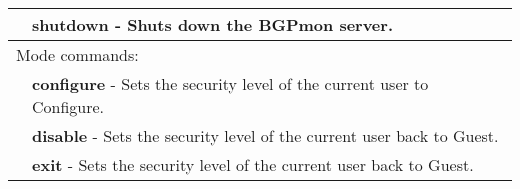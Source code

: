 \begin{tabular}{|p{10pt}p{400pt}|}
& {\bf \small shutdown} - Shuts down the BGPmon server.\\[4pt]

\hline

\multicolumn{2}{|l|}{Mode commands:}\\ 

\hline

& {\bf \small configure} - Sets the security level of the current user to Configure.\\[4pt]

& {\bf \small disable} - Sets the security level of the current user back to Guest.\\[4pt]

& {\bf \small exit} - Sets the security level of the current user back to Guest.\\[4pt]

\hline
\end{tabular}


